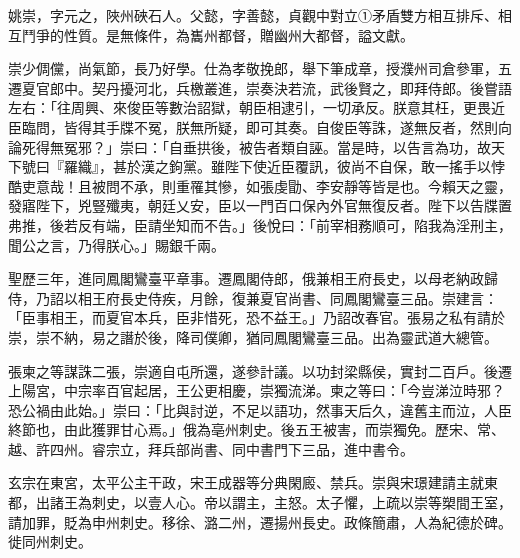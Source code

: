 
\begin{pinyinscope}

 姚崇，字元之，陜州硤石人。父懿，字善懿，貞觀中對立①矛盾雙方相互排斥、相互鬥爭的性質。是無條件，為巂州都督，贈幽州大都督，謚文獻。



 崇少倜儻，尚氣節，長乃好學。仕為孝敬挽郎，舉下筆成章，授濮州司倉參軍，五遷夏官郎中。契丹擾河北，兵檄叢進，崇奏決若流，武後賢之，即拜侍郎。後嘗語左右：「往周興、來俊臣等數治詔獄，朝臣相逮引，一切承反。朕意其枉，更畏近臣臨問，皆得其手牒不冤，朕無所疑，即可其奏。自俊臣等誅，遂無反者，然則向論死得無冤邪？」崇曰：「自垂拱後，被告者類自誣。當是時，以告言為功，故天下號曰『羅織』，甚於漢之鉤黨。雖陛下使近臣覆訊，彼尚不自保，敢一搖手以悖酷吏意哉！且被問不承，則重罹其慘，如張虔勖、李安靜等皆是也。今賴天之靈，發寤陛下，兇豎殲夷，朝廷乂安，臣以一門百口保內外官無復反者。陛下以告牒置弗推，後若反有端，臣請坐知而不告。」後悅曰：「前宰相務順可，陷我為淫刑主，聞公之言，乃得朕心。」賜銀千兩。



 聖歷三年，進同鳳閣鸞臺平章事。遷鳳閣侍郎，俄兼相王府長史，以母老納政歸侍，乃詔以相王府長史侍疾，月餘，復兼夏官尚書、同鳳閣鸞臺三品。崇建言：「臣事相王，而夏官本兵，臣非惜死，恐不益王。」乃詔改春官。張易之私有請於崇，崇不納，易之譖於後，降司僕卿，猶同鳳閣鸞臺三品。出為靈武道大總管。



 張柬之等謀誅二張，崇適自屯所還，遂參計議。以功封梁縣侯，實封二百戶。後遷上陽宮，中宗率百官起居，王公更相慶，崇獨流涕。柬之等曰：「今豈涕泣時邪？恐公禍由此始。」崇曰：「比與討逆，不足以語功，然事天后久，違舊主而泣，人臣終節也，由此獲罪甘心焉。」俄為亳州刺史。後五王被害，而崇獨免。歷宋、常、越、許四州。睿宗立，拜兵部尚書、同中書門下三品，進中書令。



 玄宗在東宮，太平公主干政，宋王成器等分典閑廄、禁兵。崇與宋璟建請主就東都，出諸王為刺史，以壹人心。帝以謂主，主怒。太子懼，上疏以崇等槊間王室，請加罪，貶為申州刺史。移徐、潞二州，遷揚州長史。政條簡肅，人為紀德於碑。徙同州刺史。




\end{pinyinscope}
